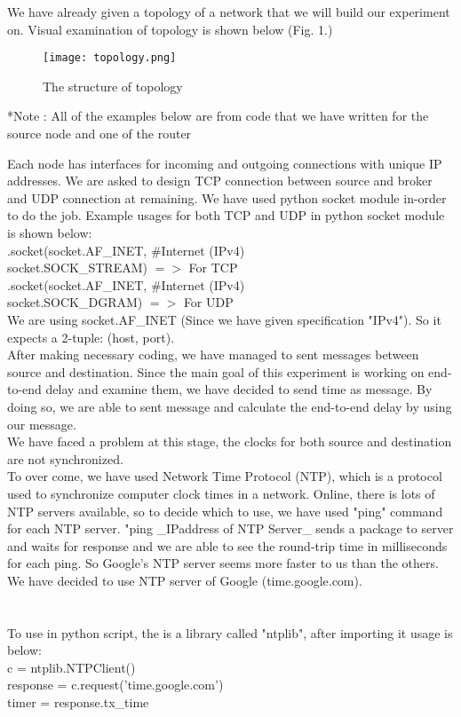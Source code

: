We have already given a topology of a network that we will build our experiment on. Visual examination of topology is shown below (Fig. 1.)\\

\begin{figure}[h]
   \centering
   \texttt{[image: topology.png]}
    \caption{The structure of topology}
    \label{fig:topology}
\end{figure}

*Note : All of the examples below are from code that we have written for the source node and one of the router

Each node has interfaces for incoming and outgoing connections with unique IP addresses. We are asked to design TCP connection between source and broker and UDP connection at remaining. We have used python socket module in-order to do the job. Example usages for both TCP and UDP in python socket module is shown below:\\
.socket(socket.AF\_INET, \#Internet (IPv4)\\
    socket.SOCK\_STREAM) $=>$ For TCP \\
.socket(socket.AF\_INET, \#Internet (IPv4)\\
    socket.SOCK\_DGRAM) $=>$ For UDP \\
We are using socket.AF\_INET (Since we have given specification "IPv4"). So it expects a 2-tuple: (host, port).\\

After making necessary coding, we have managed to sent messages between source and destination. Since the main goal of this experiment is working on end-to-end delay and examine them, we have decided to send time as message. By doing so, we are able to sent message and calculate the end-to-end delay by using our message.\\

We have faced a problem at this stage, the clocks for both source and destination are not synchronized.\\
To over come, we have used Network Time Protocol (NTP), which is a protocol used to synchronize computer clock times in a network. Online, there is lots of NTP servers available, so to decide which to use, we have used "ping" command for each NTP server. "ping \_IPaddress of NTP Server\_ sends a package to server and waits for response and we are able to see the round-trip time in milliseconds for each ping. So Google's NTP server seems more faster to us than the others. We have decided to use NTP server of Google (time.google.com).\\
\\
\\
To use in python script, the is a library called "ntplib", after importing it usage is below:\\
c = ntplib.NTPClient() \\
response = c.request('time.google.com')\\
timer = response.tx\_time\\

